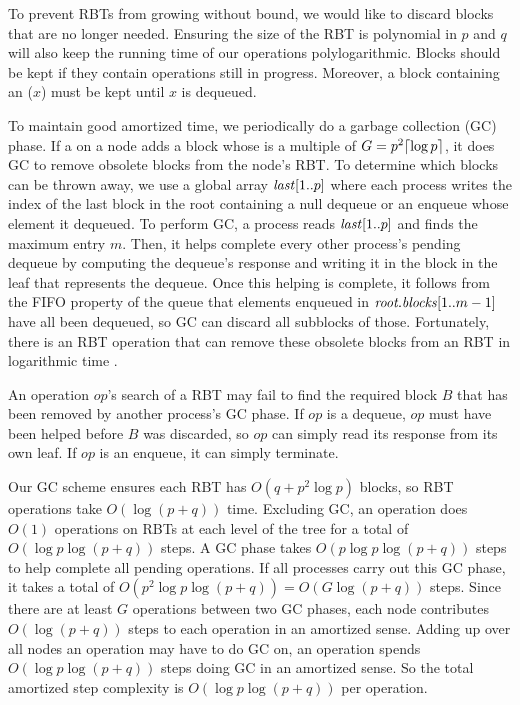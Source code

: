 To prevent RBTs from growing without bound, we would like to discard
blocks that are no longer needed.
Ensuring the size of the RBT is polynomial in $p$ and $q$ will 
also keep the running time of our operations polylogarithmic.
Blocks should be kept if they contain operations still in progress.
Moreover, a block containing an ($x$) must be kept until $x$ is dequeued.

To maintain good amortized time, we periodically do a garbage collection (GC) phase.
If a  on a node adds a block whose  is a multiple of $G=p^2\lceil \log p \rceil$, it does GC to remove obsolete blocks from the node's RBT.
To determine which blocks can be thrown away, we use a global array $\mbox{\textnormal{\textit{last}}}[1..p]$ where 
each process writes the index of the last block in the root
containing a null dequeue or an enqueue whose element it dequeued.
To perform GC, a process reads $\mbox{\textnormal{\textit{last}}}[1..p]$ and finds the maximum entry $m$.
Then, it helps complete every other process's pending dequeue 
by computing the dequeue's response and writing it in the block in the leaf that represents the dequeue.
Once this helping is complete, it follows from the FIFO property of the queue that elements enqueued 
in $\mbox{\textit{root.blocks}}[1..m-1]$ have all been dequeued, so GC can discard all subblocks of those.
Fortunately, there is an  RBT  operation that can remove
these obsolete blocks from an RBT in logarithmic time \cite[Sec.~4.2]{Tar83}.

An operation $op$'s search of a RBT may fail to find the required block $B$ that has been removed 
by another process's GC phase.  If $op$
is a dequeue, $op$ must have been helped before $B$ was discarded, so $op$ can simply read its response from
its own leaf.  If $op$ is an enqueue, it can simply terminate.

Our GC scheme ensures each RBT has  $O(q+p^2\log p)$ blocks, so RBT operations take $O(\log(p+q))$ time.
Excluding GC, an operation does $O(1)$ operations on RBTs at each level of the tree for a total of
$O(\log p\log(p + q))$ steps.
A GC phase takes $O(p\log p \log(p+q))$ steps to help complete all pending operations.
If all processes carry out this GC phase, it takes a total of $O(p^2\log p\log(p+q))=O(G\log(p+q))$ steps.
Since there are at least $G$ operations between two GC phases, each node contributes $O(\log(p+q))$ steps to each operation in an amortized sense.
Adding up over all nodes an operation may have to do GC on, 
an operation spends $O(\log p\log(p+q))$ steps doing GC in an amortized sense.
So the total amortized step complexity is  $O(\log p \log(p+q))$ per operation.

